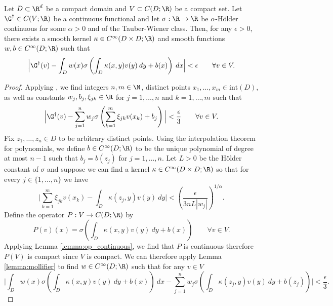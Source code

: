 {
\begin{theorem}
\label{thm:functional_chen}
Let \(D \subset \R^d\) be a compact domain and \(V \subset C(D;\R)\) be a compact set. Let \(\G^\dagger \in C(V;\R)\)
be a continuous functional and let  \(\sigma: \R \to \R\) be \(\alpha\)-H{\"o}lder continuous for some \(\alpha > 0\) and of the Tauber-Wiener class. Then, for any \(\epsilon > 0\), there exists 
a smooth kernel \(\kappa \in C^\infty (D \times D;\R)\) and smooth functions \(w, b \in C^\infty (D;\R)\) such that
\[\Big| \G^\dagger(v) - \int_D w(x) \sigma \left ( \int_D \kappa (x,y) v(y) \: dy + b(x) \right ) \: dx \Big| < \epsilon \qquad \forall v \in V.\]
\end{theorem}
\begin{proof}
Applying \cite[Theorem 4]{chen1995universal}, we find integers \(n, m \in \N\), distinct points \(x_1,\dots,x_m \in \text{int}(D)\), as well as constants
\(w_j, b_j, \xi_{jk} \in \R\) for \(j=1,\dots,n\) and \(k=1,\dots,m\) such that
\begin{equation}
\label{eq:chenchen_estimate}
\Big| \G^\dagger(v) - \sum_{j=1}^n w_j \sigma \left ( \sum_{k=1}^m \xi_{jk} v(x_k) + b_j \right ) \Big| < \frac{\epsilon}{3} \qquad \forall v \in V.
\end{equation}
Fix \(z_1,\dots,z_n \in D\) to be arbitrary distinct points. Using the interpolation theorem for polynomials, we define \(b \in C^\infty (D;\R)\) to be the unique polynomial 
of degree at most \(n-1\) such that \(b_j = b(z_j)\) for \(j=1,\dots,n\). Let \(L > 0\) be the 
H{\"o}lder constant of \(\sigma\) and suppose we can find a kernel \(\kappa \in  C^\infty (D \times D; \R)\) so that
for every \(j \in \{1,\dots,n\}\) we have
\begin{equation}
\label{eq:kernel_close}
\Big|\sum_{k=1}^m \xi_{jk} v(x_k) - \int_D \kappa(z_j, y)v(y) \: dy\Big| < \left ( \frac{\epsilon}{3nL|w_j|} \right )^{1/\alpha}.
\end{equation}
Define the operator \(P: V \to C(D;\R)\) by
\[P(v)(x) = \sigma \left ( \int_D \kappa(x,y) v(y) \: dy + b(x) \right ) \qquad \forall v \in V.\]
Applying Lemma \ref{lemma:op_continuous}, we find that{} \(P\) is continuous therefore \(P(V)\)
is compact since \(V\) is compact. We can therefore apply Lemma
\ref{lemma:mollifier} to find \(w \in C^\infty (D;\R)\) such that for any \(v \in V\)
\begin{equation}
\label{eq:weight_epsilon}
\Big|\int_D w(x) \sigma \left ( \int_D \kappa(x,y)v(y) \: dy + b(x) \right ) \: dx  - \sum_{j=1}^n w_j \sigma \left ( \int_D \kappa (z_j, y) v(y) \: dy + b(z_j) \right ) \Big| < \frac{\epsilon}{3}.

\end{equation}
\end{proof}}
